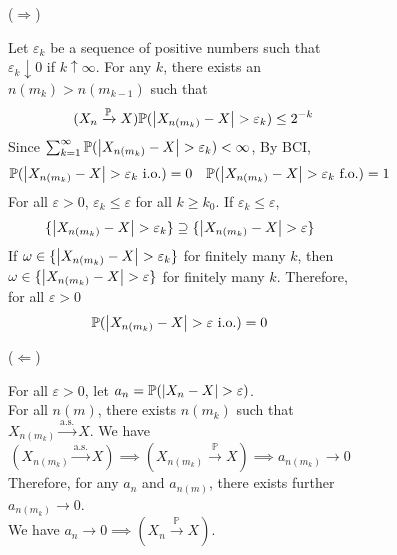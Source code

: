 \documentclass{huhtakm-template-book}
\newcommand{\prob}{\mathbb{P}}
\begin{document}
\begin{proofing}
    \begin{figure}[h!]
        \begin{subfigure}[b]{0.05\textwidth}
            ($\Longrightarrow$)
        \end{subfigure}
        \begin{subfigure}[t]{0.9\textwidth}
            Let $\varepsilon_{k}$ be a sequence of positive numbers such that $\varepsilon_{k}\downarrow 0$ if $k\uparrow\infty$. For any $k$, there exists an $n(m_{k})>n(m_{k-1})$ such that
            \begin{equation*}
                \tag{$X_{n}\xrightarrow{\prob}X$}
                \prob(\abs{X_{n(m_{k})}-X}>\varepsilon_{k})\leq 2^{-k}
            \end{equation*}
            Since $\sum_{k=1}^{\infty}\prob(\abs{X_{n(m_{k})}-X}>\varepsilon_{k})<\infty$, By BCI,
            \begin{align*}
                \prob(\abs{X_{n(m_{k})}-X}>\varepsilon_{k}\text{ i.o.})&=0 & \prob(\abs{X_{n(m_{k})}-X}>\varepsilon_{k}\text{ f.o.})&=1
            \end{align*}
            For all $\varepsilon>0$, $\varepsilon_{k}\leq\varepsilon$ for all $k\geq k_{0}$. If $\varepsilon_{k}\leq\varepsilon$,
            \begin{equation*}
                \{\abs{X_{n(m_{k})}-X}>\varepsilon_{k}\}\supseteq\{\abs{X_{n(m_{k})}-X}>\varepsilon\}
            \end{equation*}
            If $\omega\in\{\abs{X_{n(m_{k})}-X}>\varepsilon_{k}\}$ for finitely many $k$, then $\omega\in\{\abs{X_{n(m_{k})}-X}>\varepsilon\}$ for finitely many $k$. Therefore, for all $\varepsilon >0$
            \begin{equation*}
                \prob(\abs{X_{n(m_{k})}-X}>\varepsilon\text{ i.o.})=0
            \end{equation*}
        \end{subfigure}
    \end{figure}
    \begin{figure}[h!]
        \begin{subfigure}[b]{0.05\textwidth}
            ($\Longleftarrow$)
        \end{subfigure}
        \begin{subfigure}[t]{0.9\textwidth}
            For all $\varepsilon>0$, let $a_{n}=\prob(\abs{X_{n}-X}>\varepsilon)$.\\
            For all $n(m)$, there exists $n(m_{k})$ such that $X_{n(m_{k})}\xrightarrow{\text{a.s.}}X$. We have
            \begin{equation*}
                (X_{n(m_{k})}\xrightarrow{\text{a.s.}}X)\implies(X_{n(m_{k})}\xrightarrow{\prob}X)\implies a_{n(m_{k})}\to 0
            \end{equation*}
            Therefore, for any $a_{n}$ and $a_{n(m)}$, there exists further $a_{n(m_{k})}\to 0$.\\
            We have $a_{n}\to 0\implies(X_{n}\xrightarrow{\prob}X)$.
        \end{subfigure}
    \end{figure}
\end{proofing}
\end{document}
